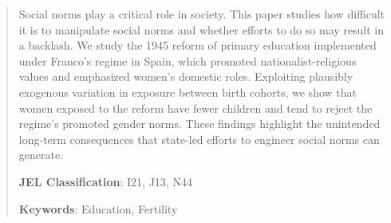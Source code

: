 \documentclass[a4paper,oneside,final,onecolumn,12pt,english]{article}
\begin{document}
\begin{titlepage}
\begin{abstract}
Social norms play a critical role in society. This paper studies how difficult it is to manipulate social norms and whether efforts to do so may result in a backlash. We study the 1945 reform of primary education implemented under Franco's regime in Spain, which promoted nationalist-religious values and emphasized women’s domestic roles. Exploiting plausibly exogenous variation in exposure between birth cohorts, we show that women exposed to the reform have fewer children and tend to reject the regime’s promoted gender norms. These findings highlight the unintended long-term consequences that state-led efforts to engineer social norms can generate.\\
\noindent \small 

 
\noindent\textbf{JEL Classification}: I21, J13, N44

\noindent\textbf{Keywords}: Education, Fertility
\end{abstract}

\end{titlepage}


\clearpage

 
\end{document}
